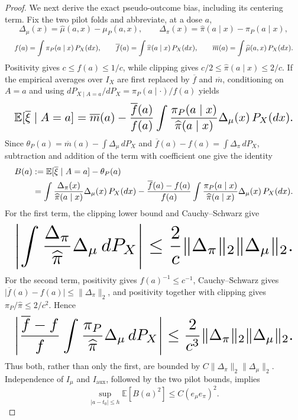 \documentclass{article}
\begin{document}
\begin{proof}
We next derive the exact pseudo-outcome bias, including its centering term. Fix the two pilot folds and abbreviate, at a dose \(a\),
\[
\Delta_\mu(x)=\widehat\mu(a,x)-\mu_P(a,x),
\qquad
\Delta_\pi(x)=\widehat\pi(a\mid x)-\pi_P(a\mid x),
\]
\[
\makebox[\linewidth][c]{\resizebox{0.98\linewidth}{!}{\(\displaystyle f(a)=\int\pi_P(a\mid x)\,P_X(dx),
\qquad
\overline f(a)=\int\widehat\pi(a\mid x)\,P_X(dx),
\qquad
\overline m(a)=\int\widehat\mu(a,x)\,P_X(dx).\)}}
\]
Positivity gives \(c\le f(a)\le1/c\), while clipping gives \(c/2\le\widehat\pi(a\mid x)\le2/c\). If the empirical averages over \(I_X\) are first replaced by \(\overline f\) and \(\overline m\), conditioning on \(A=a\) and using \(dP_{X\mid A=a}/dP_X=\pi_P(a\mid\cdot)/f(a)\) yields
\[
\makebox[\linewidth][c]{\resizebox{0.98\linewidth}{!}{\(\displaystyle \mathbb E[\overline\xi\mid A=a]
=\overline m(a)-\frac{\overline f(a)}{f(a)}
\int\frac{\pi_P(a\mid x)}{\widehat\pi(a\mid x)}\Delta_\mu(x)\,P_X(dx).\)}}
\]
Since \(\theta_P(a)=\overline m(a)-\int\Delta_\mu\,dP_X\) and \(\overline f(a)-f(a)=\int\Delta_\pi\,dP_X\), subtraction and addition of the term with coefficient one give the identity
\[
\makebox[\linewidth][c]{\resizebox{0.98\linewidth}{!}{\(\displaystyle \begin{aligned}
B(a)&:=\mathbb E[\overline\xi\mid A=a]-\theta_P(a)\\
&=\int\frac{\Delta_\pi(x)}{\widehat\pi(a\mid x)}\Delta_\mu(x)\,P_X(dx)
-\frac{\overline f(a)-f(a)}{f(a)}
\int\frac{\pi_P(a\mid x)}{\widehat\pi(a\mid x)}\Delta_\mu(x)\,P_X(dx).
\end{aligned}\)}}
\]
For the first term, the clipping lower bound and Cauchy--Schwarz give
\[
\makebox[\linewidth][c]{\resizebox{0.98\linewidth}{!}{\(\displaystyle \left\lvert\int\frac{\Delta_\pi}{\widehat\pi}\Delta_\mu\,dP_X\right\rvert
\le \frac2c\lVert\Delta_\pi\rVert_2\lVert\Delta_\mu\rVert_2.\)}}
\]
For the second term, positivity gives \(f(a)^{-1}\le c^{-1}\), Cauchy--Schwarz gives
\(\lvert\overline f(a)-f(a)\rvert\le\lVert\Delta_\pi\rVert_2\), and positivity together with clipping gives \(\pi_P/\widehat\pi\le2/c^2\). Hence
\[
\makebox[\linewidth][c]{\resizebox{0.98\linewidth}{!}{\(\displaystyle \left\lvert
\frac{\overline f-f}{f}\int\frac{\pi_P}{\widehat\pi}\Delta_\mu\,dP_X
\right\rvert
\le \frac{2}{c^3}\lVert\Delta_\pi\rVert_2\lVert\Delta_\mu\rVert_2.\)}}
\]
Thus both, rather than only the first, are bounded by \(C\lVert\Delta_\pi\rVert_2\lVert\Delta_\mu\rVert_2\). Independence of \(I_\mu\) and \(I_{\mathrm{aux}}\), followed by the two pilot bounds, implies
\[
\sup_{\lvert a-t_0\rvert\le h}\mathbb E[B(a)^2]\le C(e_\mu e_\pi)^2.
\]


\end{proof}
\end{document}
